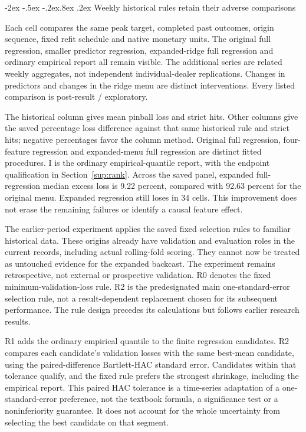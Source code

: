 \documentclass[10pt,a4paper]{article}
\makeatletter
\renewcommand\section{\@startsection{section}{1}{\z@}%
  {-2ex \@plus -.5ex \@minus -.2ex}{.8ex \@plus .2ex}%
  {\normalfont\large\bfseries}}
\makeatother
\begin{document}
\FloatBarrier


\section{Weekly historical rules retain their adverse comparisons}\label{sup:panel}\label{sup:panel-second}\label{sup:panel-levy}\label{sup:selection}\label{sup:selection-failures}

Each cell compares the same peak target, completed past outcomes,
origin sequence, fixed refit schedule and native monetary units. The original
full regression, smaller predictor regression, expanded-ridge full regression
and ordinary empirical report all remain visible. The additional series are
related weekly aggregates, not independent individual-dealer replications.
Changes in predictors and changes in the ridge menu are distinct interventions.
Every listed comparison is post-result / exploratory.

The historical column gives mean pinball loss and strict hits. Other columns
give the saved percentage loss difference against that same historical rule and
strict hits; negative percentages favor the column method. Original full
regression, four-feature regression and expanded-menu full regression are
distinct fitted procedures.
I is the ordinary
empirical-quantile report, with the endpoint qualification in Section~\ref{sup:rank}.
Across the saved panel, expanded full-regression median excess
loss is 9.22 percent,
compared with 92.63 percent for the original menu. Expanded regression still loses in 34 cells.
This improvement does not erase the remaining failures or identify a causal
feature effect.

The earlier-period experiment applies the saved fixed selection rules
to familiar historical data. These origins already have validation and
evaluation roles in the current records, including actual rolling-fold
scoring. They cannot now be treated as untouched evidence for the expanded
backcast. The experiment remains retrospective, not external or prospective
validation. R0 denotes the fixed minimum-validation-loss rule. R2 is the predesignated main one-standard-error selection rule,
not a result-dependent replacement chosen for its subsequent performance.
The rule design precedes its calculations but follows earlier research results.

R1 adds the ordinary empirical quantile to the finite regression candidates.
R2 compares each candidate's validation losses with the same best-mean
candidate, using the paired-difference Bartlett-HAC standard error. Candidates
within that tolerance qualify, and the fixed rule prefers the strongest
shrinkage, including the empirical report. This paired HAC tolerance is a
time-series adaptation of a one-standard-error preference, not the textbook
formula, a significance test or a noninferiority guarantee. It does not account
for the whole uncertainty from selecting the best candidate on that segment.
\end{document}
